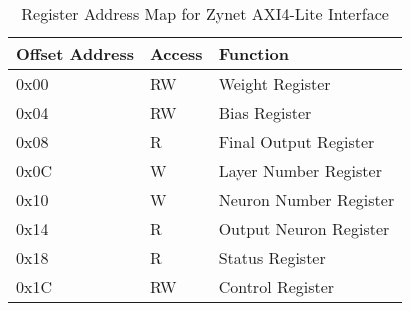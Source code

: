 \begin{table}[!h]
  \centering
  \caption{Register Address Map for Zynet AXI4-Lite Interface} 
  \begin{tabular}{l|l|l}
      \toprule
      \bf{Offset Address} & \bf{Access} & \bf{Function} \\
      \midrule
	0x00 & RW & Weight Register \\
	0x04 & RW & Bias Register \\
	0x08 & R & Final Output Register\\
	0x0C & W & Layer Number Register\\
	0x10 & W & Neuron Number Register\\
	0x14 & R & Output Neuron Register\\
	0x18 & R & Status Register\\
	0x1C & RW & Control Register\\
      \bottomrule
    \end{tabular}
    \label{table:apis}
\end{table}
